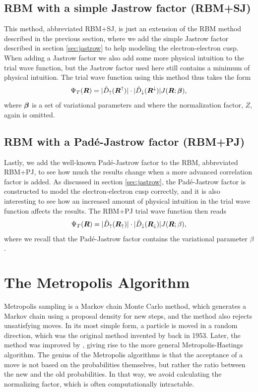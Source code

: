 \subsection{RBM with a simple Jastrow factor (RBM+SJ)} \label{sec:rbmsj}
This method, abbreviated RBM+SJ, is just an extension of the RBM method described in the previous section, where we add the simple Jastrow factor described in section \ref{sec:jastrow} to help modeling the electron-electron cusp. When adding a Jastrow factor we also add some more physical intuition to the trial wave function, but the Jastrow factor used here still contains a minimum of physical intuition. The trial wave function using this method thus takes the form
\begin{equation}
\Psi_T(\boldsymbol{{R}})=|\hat{D}_{\uparrow}(\boldsymbol{{R}}^{\uparrow})|\cdot|\hat{D}_{\downarrow}(\boldsymbol{{R}}^{\downarrow})|J(\boldsymbol{{R}};\boldsymbol{{\beta}}),
\end{equation}
where $\boldsymbol{{\beta}}$ is a set of variational parameters and where the normalization factor, $Z$, again is omitted.  

\subsection{RBM with a Padé-Jastrow factor (RBM+PJ)} \label{sec:rbmpj}
Lastly, we add the well-known Padé-Jastrow factor to the RBM, abbreviated RBM+PJ, to see how much the results change when a more advanced correlation factor is added. As discussed in section \ref{sec:jastrow}, the Padé-Jastrow factor is constructed to model the electron-electron cusp correctly, and it is also interesting to see how an increased amount of physical intuition in the trial wave function affects the results. The RBM+PJ trial wave function then reads
\begin{equation}
\Psi_T(\boldsymbol{{R}})=|\hat{D}_{\uparrow}(\boldsymbol{{R}}_{\uparrow})|\cdot|\hat{D}_{\downarrow}(\boldsymbol{{R}}_{\downarrow})|J(\boldsymbol{{R}};\beta),
\end{equation}
where we recall that the Padé-Jastrow factor contains the variational parameter $\beta$.

\section{The Metropolis Algorithm} \label{sec:metropolis}
Metropolis sampling is a Markov chain Monte Carlo method, which generates a Markov chain using a proposal density for new steps, and the method also rejects unsatisfying moves. In its most simple form, a particle is moved in a random direction, which was the original method invented by \citet{metropolis_equation_1953} back in 1953. Later, the method was improved by \citet{hastings_monte_1970}, giving rise to the more general Metropolis-Hastings algorithm. The genius of the Metropolis algorithms is that the acceptance of a move is not based on the probabilities themselves, but rather the ratio between the new and the old probabilities. In that way, we avoid calculating the normalizing factor, which is often computationally intractable.

